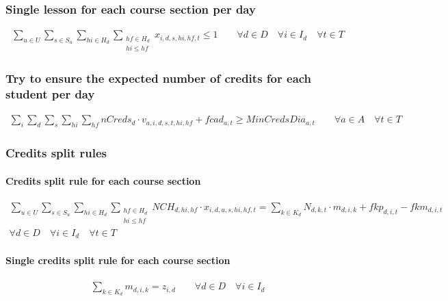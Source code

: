 \subsubsection{Single lesson for each course section per day}
\begin{eqnarray}
\sum\limits_{u \in U} \sum\limits_{s \in S_{u}} \sum\limits_{hi \in H_{d}} \sum_{\substack {hf \in H_{d} \\ hi\le hf}} x_{i,d,s,hi,hf,t}  \leq  1  \nonumber \qquad 
\forall d \in D \quad
\forall i \in I_{d} \quad
\forall t \in T 
\end{eqnarray}



\subsubsection{Try to ensure the expected number of credits for each student per day}
\begin{eqnarray}
\sum\limits_{i} \sum\limits_{d} \sum\limits_{s} \sum\limits_{hi} \sum\limits_{hf} nCreds_{d} \cdot v_{a,i,d,s,t,hi,hf} + fcad_{a,t} \ge MinCredsDia_{a,t} \nonumber \qquad
\forall a \in A \quad
\forall t \in T
\end{eqnarray}


\subsubsection{Credits split rules}

\paragraph{Credits split rule for each course section}
\begin{eqnarray}
\sum\limits_{u \in U} \sum\limits_{s \in S_{u}} \sum\limits_{hi \in H_{d}} \sum_{\substack {hf \in H_{d} \\ hi\le hf}}
 NCH_{d,hi,hf} \cdot x_{i,d,u,s,hi,hf,t} = \sum\limits_{k \in K_{d}}N_{d,k,t} \cdot m_{d,i,k} + fkp_{d,i,t} - fkm_{d,i,t} \nonumber \qquad 
\\
\forall d \in D \quad
\forall i \in I_{d} \quad
\forall t \in T
\end{eqnarray}

\paragraph{Single credits split rule for each course section}
\begin{eqnarray}
\sum\limits_{k \in K_{d}} m_{d,i,k} = z_{i,d} \nonumber \qquad 
\forall d \in D \quad
\forall i \in I_{d}
\end{eqnarray}


